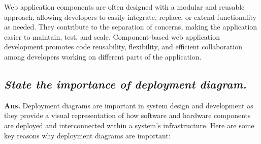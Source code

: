 \documentclass{article}
\begin{document}
Web application components are often designed with a modular and reusable approach, allowing developers to easily integrate, replace, or extend functionality as needed. They contribute to the separation of concerns, making the application easier to maintain, test, and scale. Component-based web application development promotes code reusability, flexibility, and efficient collaboration among developers working on different parts of the application.
\subsection{\textit{State the importance of deployment diagram.}}
\textbf{Ans.} Deployment diagrams are important in system design and development as they provide a visual representation of how software and hardware components are deployed and interconnected within a system's infrastructure. Here are some key reasons why deployment diagrams are important:
\end{document}
